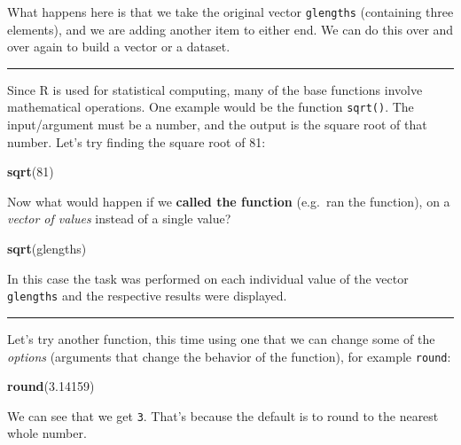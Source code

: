 \documentclass[
]{article}
\newenvironment{Shaded}{\begin{snugshade}}{\end{snugshade}}
\newcommand{\DecValTok}[1]{\textcolor[rgb]{0.00,0.00,0.81}{#1}}
\newcommand{\FloatTok}[1]{\textcolor[rgb]{0.00,0.00,0.81}{#1}}
\newcommand{\KeywordTok}[1]{\textcolor[rgb]{0.13,0.29,0.53}{\textbf{#1}}}
\newcommand{\NormalTok}[1]{#1}
\begin{document}
What happens here is that we take the original vector \texttt{glengths}
(containing three elements), and we are adding another item to either
end. We can do this over and over again to build a vector or a dataset.

\begin{center}\rule{0.5\linewidth}{0.5pt}\end{center}

Since R is used for statistical computing, many of the base functions
involve mathematical operations. One example would be the function
\texttt{sqrt()}. The input/argument must be a number, and the output is
the square root of that number. Let's try finding the square root of 81:

\begin{Shaded}
\begin{Highlighting}[]
\KeywordTok{sqrt}\NormalTok{(}\DecValTok{81}\NormalTok{)}
\end{Highlighting}
\end{Shaded}

Now what would happen if we \textbf{called the function} (e.g.~ran the
function), on a \emph{vector of values} instead of a single value?

\begin{Shaded}
\begin{Highlighting}[]
\KeywordTok{sqrt}\NormalTok{(glengths)}
\end{Highlighting}
\end{Shaded}

In this case the task was performed on each individual value of the
vector \texttt{glengths} and the respective results were displayed.

\begin{center}\rule{0.5\linewidth}{0.5pt}\end{center}

Let's try another function, this time using one that we can change some
of the \emph{options} (arguments that change the behavior of the
function), for example \texttt{round}:

\begin{Shaded}
\begin{Highlighting}[]
\KeywordTok{round}\NormalTok{(}\FloatTok{3.14159}\NormalTok{)}
\end{Highlighting}
\end{Shaded}

We can see that we get \texttt{3}. That's because the default is to
round to the nearest whole number.
\end{document}
